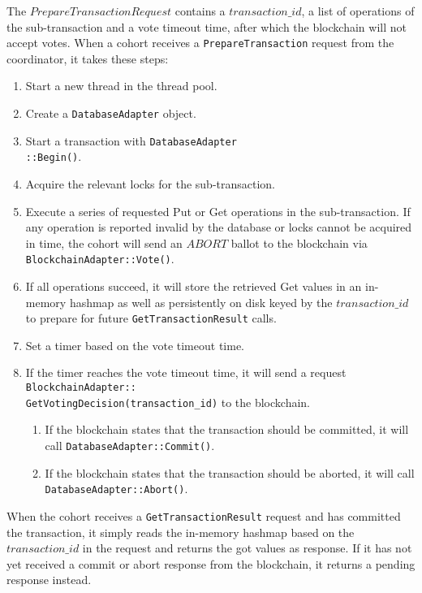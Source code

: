 \documentclass[11pt,conference]{IEEEtran}
\begin{document}
The $PrepareTransactionRequest$ contains a $transaction\_id$, a list of operations of the sub-transaction and a vote timeout time, after which the blockchain will not accept votes. When a cohort receives a \texttt{PrepareTransaction} request from the coordinator, it takes these steps: 
\begin{enumerate}
  \item Start a new thread in the thread pool.
  \item Create a \texttt{DatabaseAdapter} object.
  \item Start a transaction with 
    \texttt{DatabaseAdapter\\::Begin()}. 
  \item Acquire the relevant locks for the sub-transaction. 
  \item Execute a series of requested Put or Get operations in the sub-transaction. 
    If any operation is reported invalid by the database or locks cannot be acquired in time, the cohort will send an $ABORT$ ballot to the blockchain via \texttt{BlockchainAdapter::Vote()}.
  \item If all operations succeed, it will store the retrieved Get values in an in-memory hashmap as well as persistently on disk keyed by the $transaction\_id$ to prepare for future \texttt{GetTransactionResult} calls.
  \item Set a timer based on the vote timeout time.
  \item If the timer reaches the vote timeout time, it will send a request \texttt{BlockchainAdapter::\\GetVotingDecision(transaction\_id)} to the blockchain. 
    \begin{enumerate}
      \item If the blockchain states that the transaction should be committed, it will call \texttt{DatabaseAdapter::Commit()}.
      \item If the blockchain states that the transaction should be aborted, it will call \texttt{DatabaseAdapter::Abort()}.
    \end{enumerate}

\end{enumerate}



When the cohort receives a \texttt{GetTransaction\-Result} request and has committed the transaction, it simply reads the in-memory hashmap based on the $transaction\_id$ in the request and returns the got values as response. If it has not yet received a commit or abort response from the blockchain, it returns a pending response instead.
\end{document}
